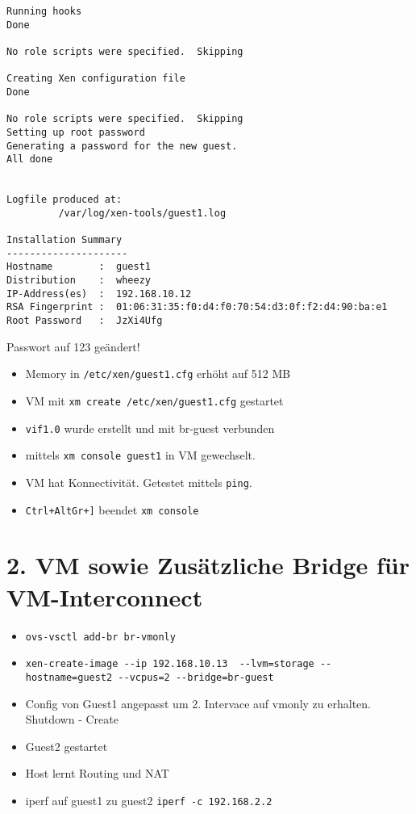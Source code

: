 \begin{verbatim}
Running hooks
Done

No role scripts were specified.  Skipping

Creating Xen configuration file
Done

No role scripts were specified.  Skipping
Setting up root password
Generating a password for the new guest.
All done


Logfile produced at:
         /var/log/xen-tools/guest1.log

Installation Summary
---------------------
Hostname        :  guest1
Distribution    :  wheezy
IP-Address(es)  :  192.168.10.12 
RSA Fingerprint :  01:06:31:35:f0:d4:f0:70:54:d3:0f:f2:d4:90:ba:e1
Root Password   :  JzXi4Ufg

\end{verbatim}
Passwort auf 123 geändert!

\begin{itemize}
	\item Memory in \verb#/etc/xen/guest1.cfg# erhöht auf 512 MB
	\item VM mit \verb#xm create /etc/xen/guest1.cfg# gestartet
	\item \verb#vif1.0# wurde erstellt und mit br-guest verbunden
	\item mittels \verb#xm console guest1# in VM gewechselt.
	\item VM hat Konnectivität. Getestet mittels \verb#ping#.
	\item \verb#Ctrl+AltGr+]# beendet \verb#xm console#
\end{itemize}

\section{2. VM sowie Zusätzliche Bridge für VM-Interconnect}
\begin{itemize}
	\item \verb#ovs-vsctl add-br br-vmonly#
	\item \verb#xen-create-image --ip 192.168.10.13  --lvm=storage --hostname=guest2 --vcpus=2 --bridge=br-guest#
	\item Config von Guest1 angepasst um 2. Intervace auf vmonly zu erhalten. Shutdown - Create
	\item Guest2 gestartet
	\item Host lernt Routing und NAT
	\item iperf auf guest1 zu guest2 \verb#iperf -c 192.168.2.2#
\end{itemize}


